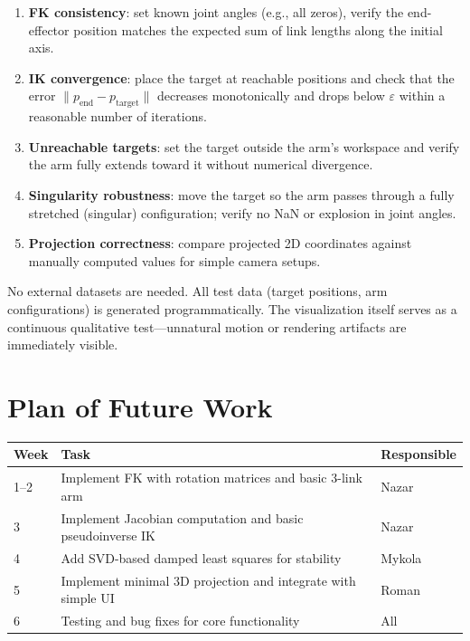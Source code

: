 \documentclass[11pt]{article}
\begin{document}
\begin{enumerate}[nosep]
    \item \textbf{FK consistency}: set known joint angles (e.g., all zeros), verify the end-effector position matches the expected sum of link lengths along the initial axis.
    \item \textbf{IK convergence}: place the target at reachable positions and check that the error $\|p_{\text{end}} - p_{\text{target}}\|$ decreases monotonically and drops below $\varepsilon$ within a reasonable number of iterations.
    \item \textbf{Unreachable targets}: set the target outside the arm's workspace and verify the arm fully extends toward it without numerical divergence.
    \item \textbf{Singularity robustness}: move the target so the arm passes through a fully stretched (singular) configuration; verify no NaN or explosion in joint angles.
    \item \textbf{Projection correctness}: compare projected 2D coordinates against manually computed values for simple camera setups.
\end{enumerate}

No external datasets are needed. All test data (target positions, arm configurations) is generated programmatically. The visualization itself serves as a continuous qualitative test---unnatural motion or rendering artifacts are immediately visible.

\section{Plan of Future Work}

\begin{table}[H]
\centering
\begin{tabular}{@{}lll@{}}
\toprule
\textbf{Week} & \textbf{Task} & \textbf{Responsible} \\
\midrule
1--2 & Implement FK with rotation matrices and basic 3-link arm & Nazar \\
3 & Implement Jacobian computation and basic pseudoinverse IK & Nazar \\
4 & Add SVD-based damped least squares for stability & Mykola \\
5 & Implement minimal 3D projection and integrate with simple UI & Roman \\
6 & Testing and bug fixes for core functionality & All \\
\bottomrule
\end{tabular}
\end{table}
\end{document}
